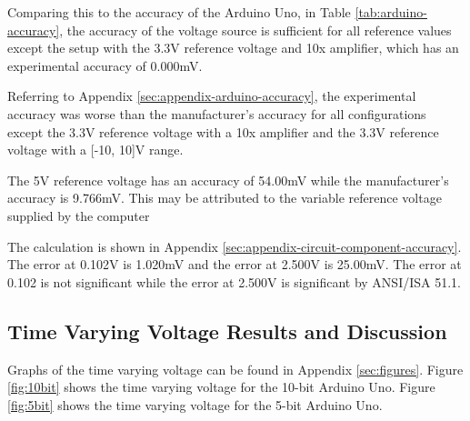 Comparing this to the accuracy of the Arduino Uno, in Table \ref{tab:arduino-accuracy}, the accuracy of 
the voltage source is sufficient for all reference values except the setup with the 3.3V reference voltage and 10x amplifier, which has an experimental accuracy of 0.000mV.


\noindent Referring to Appendix \ref{sec:appendix-arduino-accuracy}, the experimental accuracy was worse than the manufacturer's accuracy for all configurations 
except the 3.3V reference voltage with a 10x amplifier and the 3.3V reference voltage with a [-10, 10]V range.

The 5V reference voltage has an accuracy of 54.00mV while the manufacturer's accuracy is 9.766mV. This may be attributed to the variable reference voltage supplied by the computer



\noindent The calculation is shown in Appendix \ref{sec:appendix-circuit-component-accuracy}. The error at 0.102V is 1.020mV and the error at 2.500V is 25.00mV. The error at 0.102 
is not significant while the error at 2.500V is significant by ANSI/ISA 51.1.

\subsection{Time Varying Voltage Results and Discussion}
\noindent Graphs of the time varying voltage can be found in Appendix \ref{sec:figures}. Figure \ref{fig:10bit} shows the time varying voltage for the 10-bit Arduino Uno. 
Figure \ref{fig:5bit} shows the time varying voltage for the 5-bit Arduino Uno. 

